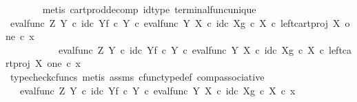 \begin{isabellebody}
\ \ \ \ \ \ \isamarkupfalse%
\ {\isacharparenleft}{\kern0pt}metis\ cart{\isacharunderscore}{\kern0pt}prod{\isacharunderscore}{\kern0pt}decomp\ id{\isacharunderscore}{\kern0pt}type\ terminal{\isacharunderscore}{\kern0pt}func{\isacharunderscore}{\kern0pt}unique{\isacharparenright}{\kern0pt}\isanewline
\ \ \ \ \isamarkupfalse%
\ {\isachardoublequoteopen}{\isacharparenleft}{\kern0pt}{\isacharparenleft}{\kern0pt}{\isacharparenleft}{\kern0pt}eval{\isacharunderscore}{\kern0pt}func\ Z\ Y\ {\isasymcirc}\isactrlsub c\ {\isasymlangle}id\isactrlsub c\ Y{\isacharcomma}{\kern0pt}f\ {\isasymcirc}\isactrlsub c\ {\isasymbeta}\isactrlbsub Y\isactrlesub {\isasymrangle}{\isacharparenright}{\kern0pt}\ {\isasymcirc}\isactrlsub c\ eval{\isacharunderscore}{\kern0pt}func\ Y\ X\ {\isasymcirc}\isactrlsub c\ {\isasymlangle}id\isactrlsub c\ X{\isacharcomma}{\kern0pt}g\ {\isasymcirc}\isactrlsub c\ {\isasymbeta}\isactrlbsub X\isactrlesub {\isasymrangle}{\isacharparenright}{\kern0pt}\ {\isasymcirc}\isactrlsub c\ left{\isacharunderscore}{\kern0pt}cart{\isacharunderscore}{\kern0pt}proj\ X\ one{\isacharparenright}{\kern0pt}\ {\isasymcirc}\isactrlsub c\ x{}\ {\isacharequal}{\kern0pt}\ \isanewline
\ \ \ \ \ \ \ \ \ \ \ {\isacharparenleft}{\kern0pt}{\isacharparenleft}{\kern0pt}eval{\isacharunderscore}{\kern0pt}func\ Z\ Y\ {\isasymcirc}\isactrlsub c\ {\isasymlangle}id\isactrlsub c\ Y{\isacharcomma}{\kern0pt}f\ {\isasymcirc}\isactrlsub c\ {\isasymbeta}\isactrlbsub Y\isactrlesub {\isasymrangle}{\isacharparenright}{\kern0pt}\ {\isasymcirc}\isactrlsub c\ eval{\isacharunderscore}{\kern0pt}func\ Y\ X\ {\isasymcirc}\isactrlsub c\ {\isasymlangle}id\isactrlsub c\ X{\isacharcomma}{\kern0pt}g\ {\isasymcirc}\isactrlsub c\ {\isasymbeta}\isactrlbsub X\isactrlesub {\isasymrangle}{\isacharparenright}{\kern0pt}\ {\isasymcirc}\isactrlsub c\ left{\isacharunderscore}{\kern0pt}cart{\isacharunderscore}{\kern0pt}proj\ X\ one\ {\isasymcirc}\isactrlsub c\ x{}{\isachardoublequoteclose}\isanewline
\ \ \ \ \ \ \isamarkupfalse%
\ {\isacharparenleft}{\kern0pt}typecheck{\isacharunderscore}{\kern0pt}cfuncs{\isacharcomma}{\kern0pt}\ metis\ assms\ cfunc{\isacharunderscore}{\kern0pt}type{\isacharunderscore}{\kern0pt}def\ comp{\isacharunderscore}{\kern0pt}associative{\isacharparenright}{\kern0pt}\isanewline
\ \ \ \ \isamarkupfalse%
\ \isamarkupfalse%
\ {\isachardoublequoteopen}{\isachardot}{\kern0pt}{\isachardot}{\kern0pt}{\isachardot}{\kern0pt}\ {\isacharequal}{\kern0pt}\ {\isacharparenleft}{\kern0pt}{\isacharparenleft}{\kern0pt}eval{\isacharunderscore}{\kern0pt}func\ Z\ Y\ {\isasymcirc}\isactrlsub c\ {\isasymlangle}id\isactrlsub c\ Y{\isacharcomma}{\kern0pt}f\ {\isasymcirc}\isactrlsub c\ {\isasymbeta}\isactrlbsub Y\isactrlesub {\isasymrangle}{\isacharparenright}{\kern0pt}\ {\isasymcirc}\isactrlsub c\ eval{\isacharunderscore}{\kern0pt}func\ Y\ X\ {\isasymcirc}\isactrlsub c\ {\isasymlangle}id\isactrlsub c\ X{\isacharcomma}{\kern0pt}g\ {\isasymcirc}\isactrlsub c\ {\isasymbeta}\isactrlbsub X\isactrlesub {\isasymrangle}{\isacharparenright}{\kern0pt}\ {\isasymcirc}\isactrlsub c\ x{\isachardoublequoteclose}\isanewline

\end{isabellebody}
